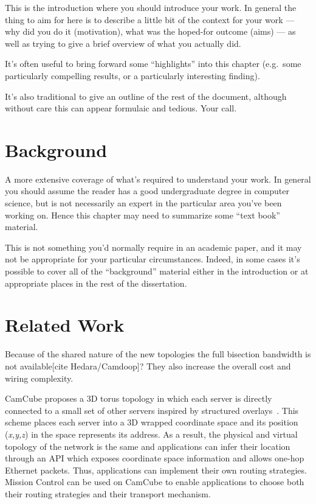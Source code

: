 \documentclass[a4paper,12pt,twoside,openright]{report}
\begin{document}
This is the introduction where you should introduce your work.  In
general the thing to aim for here is to describe a little bit of the
context for your work --- why did you do it (motivation), what was the
hoped-for outcome (aims) --- as well as trying to give a brief
overview of what you actually did.

It's often useful to bring forward some ``highlights'' into 
this chapter (e.g.\ some particularly compelling results, or 
a particularly interesting finding). 

It's also traditional to give an outline of the rest of the
document, although without care this can appear formulaic 
and tedious. Your call. 


\chapter{Background} 

A more extensive coverage of what's required to understand your 
work. In general you should assume the reader has a good undergraduate 
degree in computer science, but is not necessarily an expert in 
the particular area you've been working on. Hence this chapter 
may need to summarize some ``text book'' material. 

This is not something you'd normally require in an academic paper, 
and it may not be appropriate for your particular circumstances. 
Indeed, in some cases it's possible to cover all of the ``background'' 
material either in the introduction or at appropriate places in 
the rest of the dissertation. 


\chapter{Related Work} 

Because of the shared nature of the new topologies the full bisection bandwidth
is not available[cite Hedara/Camdoop]? They also increase the overall cost and
wiring complexity.

CamCube proposes a 3D torus topology in which each server is directly connected
to a small set of other servers inspired by structured
overlays~\cite{Abu-Libdeh:2010:SRF}. This scheme places each server into a 3D
wrapped coordinate space and its position (\emph{x,y,z}) in the space represents
its address. As a result, the physical and virtual topology of the network is
the same and applications can infer their location through an API which exposes
coordinate space information and allows one-hop Ethernet packets. Thus,
applications can implement their own routing strategies. Mission Control can be
used on CamCube to enable applications to choose both their routing strategies
and their transport mechanism.
\end{document}
